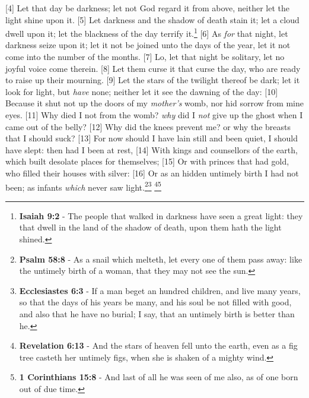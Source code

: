 [4] \textcolor[cmyk]{0.99998,1,0,0}{Let that day be darkness; let not God regard it from above, neither let the light shine upon it.}
[5] \textcolor[cmyk]{0.99998,1,0,0}{Let darkness and the shadow of death stain it; let a cloud dwell upon it; let the blackness of the day terrify it.}\footnote{\textbf{Isaiah 9:2} - The people that walked in darkness have seen a great light: they that dwell in the land of the shadow of death, upon them hath the light shined.}
[6] \textcolor[cmyk]{0.99998,1,0,0}{As \emph{for} that night, let darkness seize upon it; let it not be joined unto the days of the year, let it not come into the number of the months.}
[7] \textcolor[cmyk]{0.99998,1,0,0}{Lo, let that night be solitary, let no joyful voice come therein.}
[8] \textcolor[cmyk]{0.99998,1,0,0}{Let them curse it that curse the day, who are ready to raise up their mourning.}
[9] \textcolor[cmyk]{0.99998,1,0,0}{Let the stars of the twilight thereof be dark; let it look for light, but \emph{have} none; neither let it see the dawning of the day:}
[10] \textcolor[cmyk]{0.99998,1,0,0}{Because it shut not up the doors of my \emph{mother's} womb, nor hid sorrow from mine eyes.}
[11] \textcolor[cmyk]{0.99998,1,0,0}{Why died I not from the womb? \emph{why} did I \emph{not} give up the ghost when I came out of the belly?}
[12] \textcolor[cmyk]{0.99998,1,0,0}{Why did the knees prevent me? or why the breasts that I should suck?}
[13] \textcolor[cmyk]{0.99998,1,0,0}{For now should I have lain still and been quiet, I should have slept: then had I been at rest,}
[14] \textcolor[cmyk]{0.99998,1,0,0}{With kings and counsellors of the earth, which built desolate places for themselves;}
[15] \textcolor[cmyk]{0.99998,1,0,0}{Or with princes that had gold, who filled their houses with silver:}
[16] \textcolor[cmyk]{0.99998,1,0,0}{Or as an hidden untimely birth I had not been; as infants \emph{which} never saw light.}\footnote{\textbf{Psalm 58:8} - As a snail which melteth, let every one of them pass away: like the untimely birth of a woman, that they may not see the sun.}\footnote{\textbf{Ecclesiastes 6:3} - If a man beget an hundred children, and live many years, so that the days of his years be many, and his soul be not filled with good, and also that he have no burial; I say, that an untimely birth is better than he.}
\footnote{\textbf{Revelation 6:13} - And the stars of heaven fell unto the earth, even as a fig tree casteth her untimely figs, when she is shaken of a mighty wind.}\footnote{\textbf{1 Corinthians 15:8} - And last of all he was seen of me also, as of one born out of due time.}
